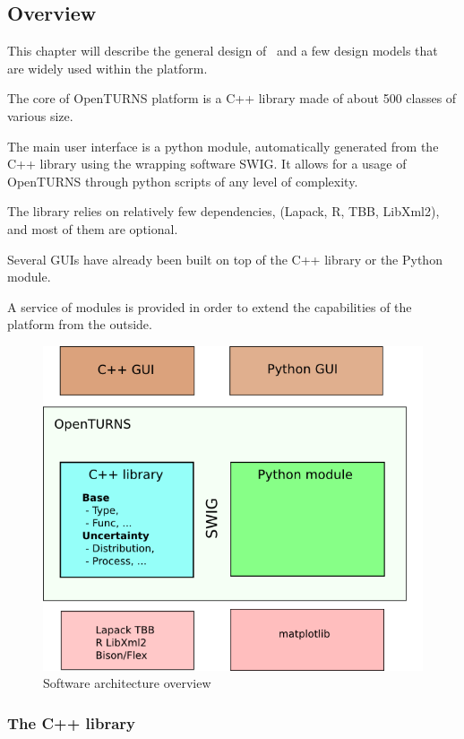 \subsection{Overview}

This chapter will describe the general design of \OT\, and a few design models that are widely used within the platform.

The core of OpenTURNS platform is a C++ library made of about 500 classes of various size.

The main user interface is a python module, automatically generated from the C++ library using the wrapping software SWIG. It allows for a usage of OpenTURNS through python scripts of any level of complexity.

The library relies on relatively few dependencies, (Lapack, R, TBB, LibXml2), and most of them are optional.

Several GUIs have already been built on top of the C++ library or the Python module.

A service of modules is provided in order to extend the capabilities of the platform from the outside.

\begin{figure}[H]
\begin{center}
\includegraphics[scale=0.5]{Figures/architecture.png}
\caption{Software architecture overview}
\end{center}
\end{figure}

\subsubsection{The C++ library}

